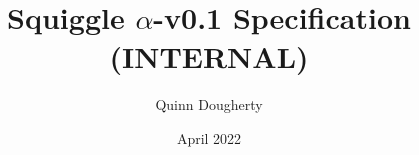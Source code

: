 \documentclass{article}
\title{Squiggle $\alpha$-v0.1 Specification (INTERNAL)}
\author{Quinn Dougherty}
\date{April 2022}
\begin{document}
\maketitle{}

\nocite{*}




\printbibliography
\end{document}
